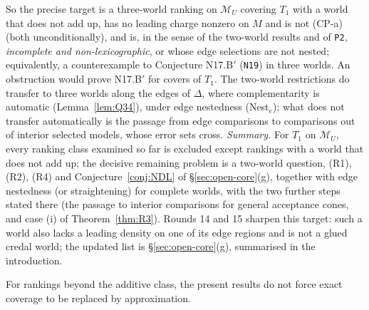 \documentclass[11pt]{article}
\theoremstyle{definition}
\theoremstyle{remark}
\newcommand{\M}{\mathcal M}
\newcommand{\src}[1]{\texttt{#1}}
\begin{document}
So the precise target is a three-world ranking on $\M_U$ covering $T_1$ with a world that does not add up, has no leading charge nonzero on $M$ and is not (CP-a) (both unconditionally), and is, in the sense of the two-world results and of \src{P2}, \emph{incomplete and non-lexicographic}, or whose edge selections are not nested; equivalently, a counterexample to Conjecture N17.B$'$ (\src{N19}) in three worlds. An obstruction would prove N17.B$'$ for covers of $T_1$. The two-world restrictions do transfer to three worlds along the edges of $\Delta$, where complementarity is automatic (Lemma~\ref{lem:Q34}), under edge nestedness (Nest$_e$); what does not transfer automatically is the passage from edge comparisons to comparisons out of interior selected models, whose error sets cross. \emph{Summary.} For $T_1$ on $\M_U$, every ranking class examined so far is excluded except rankings with a world that does not add up; the decisive remaining problem is a two-world question, (R1), (R2), (R4) and Conjecture~\ref{conj:NDL} of \S\ref{sec:open-core}(g), together with edge nestedness (or straightening) for complete worlds, with the two further steps stated there (the passage to interior comparisons for general acceptance cones, and case (i) of Theorem~\ref{thm:R3}). Rounds 14 and 15 sharpen this target: such a world also lacks a leading density on one of its edge regions and is not a glued credal world; the updated list is \S\ref{sec:open-core}(g), summarised in the introduction.

For rankings beyond the additive class, the present results do not force exact coverage to be replaced by approximation.
\end{document}
